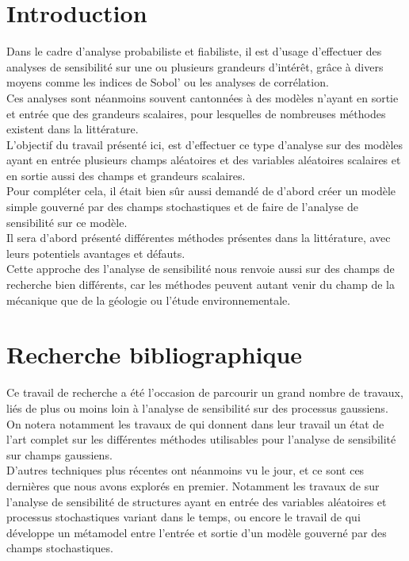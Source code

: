 \documentclass[a4paper,10pt]{article}
\begin{document}
\section{Introduction}
Dans le cadre d'analyse probabiliste et fiabiliste, il est d'usage d’effectuer 
des analyses de sensibilité sur une ou plusieurs grandeurs d’intérêt, grâce
à divers moyens comme les indices de Sobol' ou les analyses de corrélation. \\
Ces analyses sont néanmoins souvent cantonnées à des modèles n'ayant en sortie et entrée que des
grandeurs scalaires, pour lesquelles de nombreuses méthodes existent dans la littérature.\\
L'objectif du travail présenté ici, est d’effectuer ce type d'analyse sur des modèles ayant en entrée plusieurs champs aléatoires et des variables aléatoires scalaires et en sortie aussi des champs et grandeurs scalaires. \\ Pour compléter cela, il était bien sûr aussi demandé de d'abord créer un modèle simple gouverné par des champs stochastiques et de faire de l'analyse de sensibilité sur ce modèle. \\
Il sera d'abord présenté différentes méthodes présentes dans la littérature, avec leurs potentiels avantages et défauts. \\ 
Cette approche des l'analyse de sensibilité nous renvoie aussi sur des champs de recherche bien différents, car les méthodes peuvent autant venir du champ de la mécanique que de la géologie ou l'étude environnementale.

 
\section{Recherche bibliographique}
Ce travail de recherche a été l'occasion de parcourir un grand nombre de travaux, liés de plus ou moins loin à l'analyse de sensibilité sur des processus gaussiens.\\
On notera notamment les travaux de \cite{Lilburne2009Feb} qui donnent dans leur travail un état de l'art complet sur les différentes méthodes utilisables pour l'analyse de sensibilité sur champs gaussiens. \\
D'autres techniques plus récentes ont néanmoins vu le jour, et ce sont ces dernières que nous avons explorés en premier. Notamment les travaux de \cite{Wei2017May} sur l'analyse de sensibilité de structures ayant en entrée des variables aléatoires et processus stochastiques variant dans le temps, ou encore le travail de \cite{Pronzato2019Jul} qui développe un métamodel entre l'entrée et sortie d'un modèle gouverné par des champs stochastiques.
\end{document}
